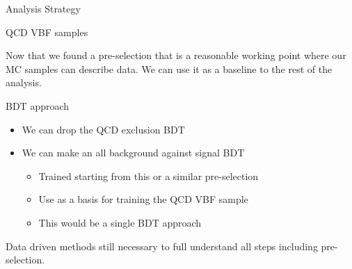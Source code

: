 \documentclass[8pt]{beamer}
\begin{document}
\begin{frame}{Analysis Strategy}

\begin{block}{QCD VBF samples}
 
Now that we found a pre-selection that is a reasonable working point where our MC samples can describe data. We can use it as a baseline to the rest of the analysis.

\end{block}

\begin{block}{BDT approach}
 
\begin{itemize}
 \item We can drop the QCD exclusion BDT
 \item We can make an all background against signal BDT 
 \begin{itemize}
   \item Trained starting from this or a similar pre-selection
   \item Use as a basis for training the QCD VBF sample
   \item This would be a single BDT approach
  \end{itemize}
\end{itemize}
 
Data driven methods still necessary to full understand all steps including pre-selection. 
 
\end{block}
 
\end{frame}

%  
%  
%  
% 
%  
\end{document}
